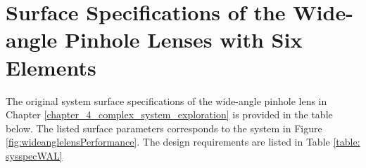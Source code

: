 \newpage
\section{Surface Specifications of the Wide-angle Pinhole Lenses with Six Elements} 
\label{apdx: wide-angle-specs_6_elements}

The original system surface specifications of the wide-angle pinhole lens in Chapter \ref{chapter_4_complex_system_exploration} is provided in the table below. The listed surface parameters corresponds to the system in Figure \ref{fig:wideanglelensPerformance}. The design requirements are listed in Table \ref{table: sysspecWAL}

\setlength{\arrayrulewidth}{.5mm}
\setlength{\tabcolsep}{18pt}
\renewcommand{\arraystretch}{1.2}
